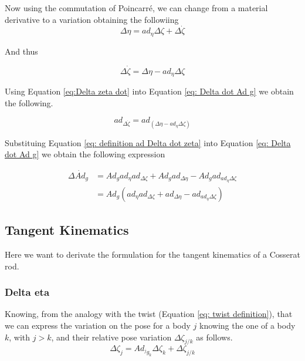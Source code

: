 \documentclass[12pt,a4paper]{book}
\begin{document}
Now using the commutation of Poincarré, we can change from a material derivative to a variation obtaining the followiing
\begin{equation}
	\Delta \eta	 = ad_{\eta} \Delta \zeta + \Delta \dot{\zeta}
\end{equation}

And thus 

\begin{equation}\label{eq:Delta zeta dot}
	\Delta \dot{\zeta}	 = \Delta \eta - ad_{\eta} \Delta \zeta 
\end{equation}

Using Equation \eqref{eq:Delta zeta dot} into Equation \eqref{eq: Delta dot Ad g} we obtain the following.

\begin{equation}\label{eq: definition ad Delta dot zeta}
	ad_{\Delta \dot{\zeta}} = ad_{(\Delta \eta - ad_\eta \Delta \zeta)}
\end{equation}

Substituing Equation \eqref{eq: definition ad Delta dot zeta} into Equation \eqref{eq: Delta dot Ad g} we obtain the following expression

\begin{equation}\label{eq: Delta dot Ad g final}
\begin{aligned}
	\Delta \dot{Ad}_g 	&= Ad_g ad_\eta ad_{\Delta \zeta} + Ad_g ad_{\Delta \eta} - Ad_g ad_{ad_\eta \Delta \zeta} \\
					&= Ad_g \left( ad_\eta ad_{\Delta \zeta} +  ad_{\Delta \eta} -  ad_{ad_\eta \Delta \zeta} \right)
\end{aligned}
\end{equation}



\subsection{Tangent Kinematics}

Here we want to derivate the formulation for the tangent kinematics of a Cosserat rod.

\subsubsection{Delta eta}

Knowing, from the analogy with the twist (Equation \eqref{eq: twist definition}), that we can express the variation on the pose for a body $j$ knowing the one of a body $k$, with $j>k$, and their relative pose variation $\Delta \zeta_{j/k}$ as follows.
\begin{equation}
	\Delta \zeta _ j = Ad_{^j g _k} \Delta \zeta _k + \Delta \zeta _ {j/k}
\end{equation}
\end{document}
